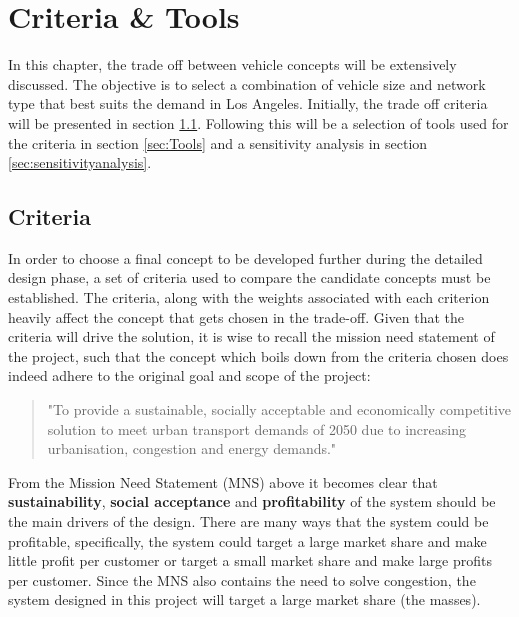 \newpage
\chapter{Criteria \& Tools}
\label{CriteriaTools}

In this chapter, the trade off between vehicle concepts will be extensively discussed. The objective is to select a combination of vehicle size and network type that best suits the demand in Los Angeles. Initially, the trade off criteria will be presented in section \ref{sec:Criteria}. Following this will be a selection of tools used for the criteria in section \ref{sec:Tools} and a sensitivity analysis in section \ref{sec:sensitivityanalysis}. 



\section{Criteria}
\label{sec:Criteria}



In order to choose a final concept to be developed further during the detailed design phase, a set of criteria used to compare the candidate concepts must be established. The criteria, along with the weights associated with each criterion heavily affect the concept that gets chosen in the trade-off. Given that the criteria will drive the solution, it is wise to recall the mission need statement of the project, such that the concept which boils down from the criteria chosen does indeed adhere to the original goal and scope of the project:

\begin{quote}
    "To provide a sustainable, socially acceptable and economically competitive solution to meet urban transport demands of 2050 due to increasing urbanisation, congestion and energy demands."
\end{quote}

From the Mission Need Statement (MNS) above it becomes clear that \textbf{sustainability}, \textbf{social acceptance} and \textbf{profitability} of the system should be the main drivers of the design. There are many ways that the system could be profitable, specifically, the system could target a large market share and make little profit per customer or target a small market share and make large profits per customer. Since the MNS also contains the need to solve congestion, the system designed in this project will target a large market share (the masses).

